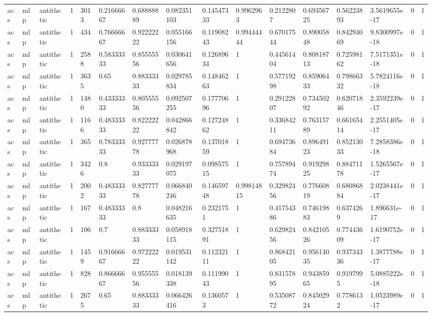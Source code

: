 \begin{tabular}{llllllllllllllll}
acs & mlp & antithetic & 1 & 3013 & 0.21666667 & 0.68888889 & 0.082351103 & 0.14547333 & 0.9962963 & 0.2122807 & 0.69356725 & 0.56223893 & 3.5619655e-17 & 0 & 1 \\
acs & mlp & antithetic & 1 & 434 & 0.76666667 & 0.92222222 & 0.055166156 & 0.11908243 & 0.99444444 & 0.67017544 & 0.89005848 & 0.84294069 & 9.8300997e-18 & 0 & 1 \\
acs & mlp & antithetic & 1 & 2588 & 0.58333333 & 0.85555556 & 0.030641656 & 0.12689634 & 1 & 0.44561404 & 0.80818713 & 0.72598162 & 7.5171351e-18 & 0 & 1 \\
acs & mlp & antithetic & 1 & 3635 & 0.65 & 0.88333333 & 0.029785834 & 0.14846263 & 1 & 0.57719298 & 0.85906433 & 0.79866332 & 5.7824116e-18 & 0 & 1 \\
acs & mlp & antithetic & 1 & 1480 & 0.43333333 & 0.80555556 & 0.092507255 & 0.17770696 & 1 & 0.29122807 & 0.73450292 & 0.62071846 & 2.3592239e-17 & 0 & 1 \\
acs & mlp & antithetic & 1 & 1166 & 0.48333333 & 0.82222222 & 0.042866842 & 0.12724862 & 1 & 0.33684211 & 0.76315789 & 0.66165414 & 2.2551405e-17 & 0 & 1 \\
acs & mlp & antithetic & 1 & 365 & 0.78333333 & 0.92777778 & 0.026878968 & 0.13701859 & 1 & 0.69473684 & 0.89649123 & 0.85213033 & 7.2858386e-18 & 0 & 1 \\
acs & mlp & antithetic & 1 & 3426 & 0.8 & 0.93333333 & 0.029197075 & 0.09857515 & 1 & 0.75789474 & 0.91929825 & 0.88471178 & 1.5265567e-17 & 0 & 1 \\
acs & mlp & antithetic & 1 & 2002 & 0.48333333 & 0.82777778 & 0.066840246 & 0.14659748 & 0.99814815 & 0.32982456 & 0.77660819 & 0.68086884 & 2.0238441e-17 & 0 & 1 \\
acs & mlp & antithetic & 1 & 167 & 0.48333333 & 0.8 & 0.048216635 & 0.2321751 & 1 & 0.41754386 & 0.74619883 & 0.6374269 & 1.896631e-17 & 0 & 1 \\
acs & mlp & antithetic & 1 & 106 & 0.7 & 0.88333333 & 0.058918115 & 0.32751891 & 1 & 0.62982456 & 0.84210526 & 0.77443609 & 1.6190752e-17 & 0 & 1 \\
acs & mlp & antithetic & 1 & 1459 & 0.91666667 & 0.97222222 & 0.019531142 & 0.11232111 & 1 & 0.86842105 & 0.95614035 & 0.93734336 & 1.3877788e-17 & 0 & 1 \\
acs & mlp & antithetic & 1 & 828 & 0.86666667 & 0.95555556 & 0.018139338 & 0.11199043 & 1 & 0.83157895 & 0.94385965 & 0.9197995 & 5.0885222e-18 & 0 & 1 \\
acs & mlp & antithetic & 1 & 2675 & 0.65 & 0.88333333 & 0.066426416 & 0.1360573 & 1 & 0.53508772 & 0.84502924 & 0.7786132 & 1.0523989e-17 & 0 & 1 \\

\end{tabular}

